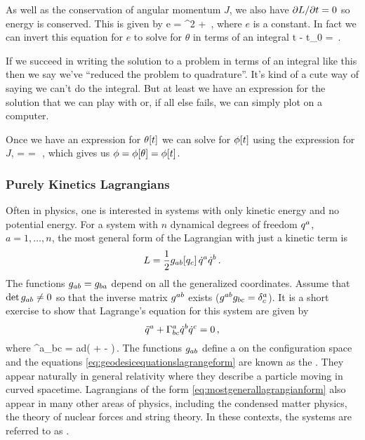 As well as the conservation of angular momentum $J$, we also have $\partial L/\partial t = 0$ so energy is conserved. This is given by
\beq
e = \dt\theta^2 + \pen{}\vat\theta\,,
\eeq
where $e$ is a constant. In fact we can invert this equation for $e$ to solve for $\theta$ in terms of an integral
\beq
t - t_0 = \int{}\,.
\eeq

If we succeed in writing the solution to a problem in terms of an integral like this then we say we've ``reduced the problem to quadrature''. It's kind of a cute way of saying we can't do the integral. But at least we have an expression for the solution that we can play with or, if all else fails, we can simply plot on a computer.

Once we have an expression for $\theta\!\left[{t}\right]$ we can solve for $\phi\!\left[{t}\right]$ using the expression for $J$,
\beq
\phi = \int{} 
     = \int{}\,\dx\theta\,,
\eeq
which gives us $\phi = \phi\!\left[{\theta}\right] = \phi\!\left[{t}\right]$.


\subsubsection{Purely Kinetics Lagrangians}
Often in physics, one is interested in systems with only kinetic energy and no potential energy. For a system with $n$ dynamical degrees of freedom ${q}^{a}$, $a = 1,\dotsc, n$, the most general form of the Lagrangian with just a kinetic term is
\begin{equation}\label{eq:mostgenerallagrangianform}
L = \dfrac{1}{2}g_{{a}{b}}\!\left[{{q}_{c}}\right]{\dot{q}}^{a}{\dot{q}}^{b}\,.
\end{equation}
The functions $g_{{a}{b}} = g_{{b}{a}}$ depend on all the generalized coordinates. Assume that $\det{g_{{a}{b}}} \neq 0$ so that the inverse matrix $g^{{a}{b}}$ exists ($g^{{a}{b}}g_{{b}{c}} = \delta^{a}_{c}$). It is a short exercise to show that Lagrange's equation for this system are given by
\begin{equation}\label{eq:geodesicequationslagrangeform}
{\ddot{q}}^{a} + \Gamma^a_{bc}{\dot{q}}^{b}{\dot{q}}^{c} = 0\,,
\end{equation}
where
\beq
\Gamma^a_{bc} = \imet ad\left( 
                +  
                -  
                \right)\,.
\eeq
The functions $g_{{a}{b}}$ define a  on the configuration space and the equations \cref{eq:geodesicequationslagrangeform} are known as the . They appear naturally in general relativity where they describe a particle moving in curved spacetime. Lagrangians of the form \cref{eq:mostgenerallagrangianform} also appear in many other areas of physics, including the condensed matter physics, the theory of nuclear forces and string theory. In these contexts, the systems are referred to as .


